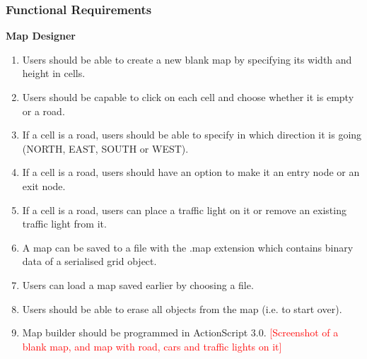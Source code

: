 \documentclass{article}
\begin{document}
\subsubsection{Functional Requirements}
{\bf Map Designer}
\begin{enumerate}
	\item Users should be able to create a new blank map by specifying its width and height in cells. 
	\item Users should be capable to click on each cell and choose whether it is empty or a road.
	\item If a cell is a road, users should be able to specify in which direction it is going (NORTH, EAST, SOUTH or WEST).
	\item If a cell is a road, users should have an option to make it an entry node or an exit node.
	\item If a cell is a road, users can place a traffic light on it or remove an existing traffic light from it. 
	\item A map can be saved to a file with the .map extension which contains binary data of a serialised grid object.
	\item Users can load a map saved earlier by choosing a file.
    \item  Users should be able to erase all objects from the map (i.e. to start over). 
	\item Map builder should be programmed in ActionScript 3.0. 
	\textcolor{red}{[Screenshot of a blank map, and map with road, cars and traffic lights on it]}
\end{enumerate}
\end{document}
